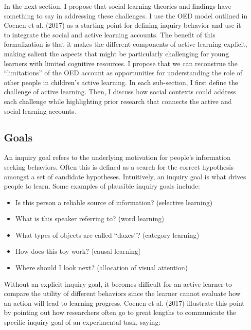 \documentclass[english,floatsintext,man]{apa6}
\providecommand{\tightlist}{%
  \setlength{\itemsep}{0pt}\setlength{\parskip}{0pt}}
\theoremstyle{definition}
\theoremstyle{definition}
\theoremstyle{definition}
\theoremstyle{remark}
\begin{document}
\noindent
In the next section, I propose that social learning theories and
findings have something to say in addressing these challenges. I use the
OED model outlined in Coenen et al. (2017) as a starting point for
defining inquiry behavior and use it to integrate the social and active
learning accounts. The benefit of this formalization is that it makes
the different components of active learning explicit, making salient the
aspects that might be particularly challenging for young learners with
limited cognitive resources. I propose that we can reconstrue the
\enquote{limitations} of the OED account as opportunities for
understanding the role of other people in children's active learning. In
each sub-section, I first define the challenge of active learning. Then,
I discuss how social contexts could address each challenge while
highlighting prior research that connects the active and social learning
accounts.

\subsection{Goals}\label{goals}

An inquiry goal refers to the underlying motivation for people's
information seeking behaviors. Often this is defined as a search for the
correct hypothesis amongst a set of candidate hypotheses. Intuitively,
an inquiry goal is what drives people to learn. Some examples of
plausible inquiry goals include:

\begin{itemize}
\tightlist
\item
  Is this person a reliable source of information? (selective learning)
\item
  What is this speaker referring to? (word learning)
\item
  What types of objects are called \enquote{daxes}? (category learning)
\item
  How does this toy work? (causal learning)
\item
  Where should I look next? (allocation of visual attention)
\end{itemize}

\noindent
Without an explicit inquiry goal, it becomes difficult for an active
learner to compare the utility of different behaviors since the learner
cannot evaluate how an action will lead to learning progress. Coenen et
al. (2017) illustrate this point by pointing out how researchers often
go to great lengths to communicate the specific inquiry goal of an
experimental task, saying:
\end{document}
